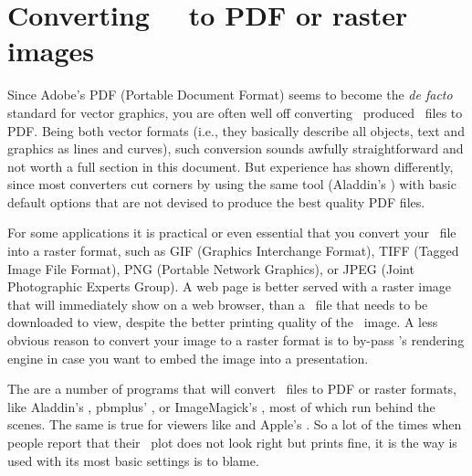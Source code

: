 \section{Converting \gmt\ \PS\ to PDF or raster images}

Since Adobe's PDF (Portable Document Format) seems to become the \emph{de facto} standard for vector graphics, you are often well off converting \GMT\ produced \PS\ files to PDF. Being both vector formats (i.e., they basically describe all objects, text and graphics as lines and curves), such conversion sounds awfully straightforward and not worth a full section in this document. But experience has shown differently, since most converters cut corners by using the same tool (Aladdin's ) with basic default options that are not devised to produce the best quality PDF files.

For some applications it is practical or even essential that you convert your \PS\ file into a raster format, such as GIF (Graphics Interchange Format), TIFF (Tagged Image File Format), PNG (Portable Network Graphics), or JPEG (Joint Photographic Experts Group). A web page is better served with a raster image that will immediately show on a web browser, than a \PS\ file that needs to be downloaded to view, despite the better printing quality of the \PS\ image. A less obvious reason to convert your image to a raster format is to by-pass 's rendering engine in case you want to embed the image into a presentation.

The are a number of programs that will convert \PS\ files to PDF or raster formats, like Aladdin's , pbmplus' , or ImageMagick's , most of which run  behind the scenes. The same is true for viewers like  and Apple's . So a lot of the times when people report that their \PS\ plot does not look right but prints fine, it is the way  is used with its most basic settings is to blame.

